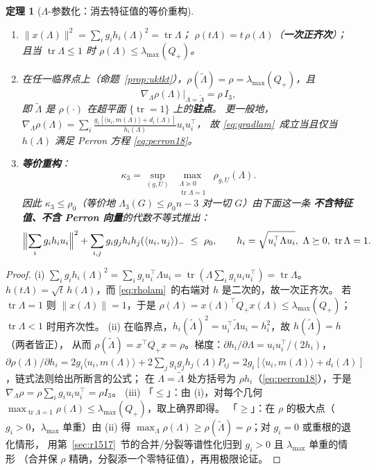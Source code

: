 \documentclass[UTF8,11pt]{ctexart}
\newtheorem{theorem}{定理}[section]
\theoremstyle{definition}
\newcommand{\Lam}{\Lambda}
\newcommand{\tr}{\operatorname{tr}}
\begin{document}
\begin{theorem}[$\Lam$-参数化：消去特征值的等价重构]\label{thm:lamparam}
\begin{enumerate}\itemsep3pt
\item[(i)] $\|x(\Lam)\|^2=\sum_ig_ih_i(\Lam)^2=\tr\Lam$；
$\rho(t\Lam)=t\,\rho(\Lam)$（\textbf{一次正齐次}）；
且当 $\tr\Lam\le1$ 时 $\rho(\Lam)\le\lambda_{\max}(Q_+)$。
\item[(ii)] 在任一临界点上（命题~\ref{prop:uktkt}），$\rho(\tilde\Lam)=\rho=\lambda_{\max}(Q_+)$，且
\begin{equation}\label{eq:gradlam}
\nabla_\Lam\rho(\Lam)\big|_{\Lam=\tilde\Lam}=\rho\,I_3 ,
\end{equation}
即 $\tilde\Lam$ 是 $\rho(\cdot)$ 在超平面 $\{\tr=1\}$ 上的\textbf{驻点}。
更一般地，$\nabla_\Lam\rho(\Lam)=\sum_i\frac{g_i[\langle u_i,m(\Lam)\rangle+d_i(\Lam)]}{h_i(\Lam)}u_iu_i^\top$，
故 \eqref{eq:gradlam}~成立当且仅当 $h(\Lam)$ 满足 Perron 方程 \eqref{eq:perron18}。
\item[(iii)] \textbf{等价重构}：
\begin{equation}\label{eq:kappalam}
\kappa_3=\sup_{(g,U)}\ \max_{\substack{\Lam\succeq0\\ \tr\Lam=1}}\ \rho_{g,U}(\Lam) .
\end{equation}
因此 $\kappa_3\le\rho_0$（等价地 $\Lam_3(G)\le\rho_0n-3$ 对一切 $G$）由下面这一条
\textbf{不含特征值、不含 Perron 向量}的代数不等式推出：
\begin{equation}\label{eq:starmain}
\Bigl\|\sum_ig_ih_iu_i\Bigr\|^2+\sum_{i,j}g_ig_jh_ih_j(\langle u_i,u_j\rangle)_-\ \le\ \rho_0 ,
\qquad h_i=\sqrt{u_i^\top\Lam u_i},\ \Lam\succeq0,\ \tr\Lam=1 .
\end{equation}
\end{enumerate}
\end{theorem}

\begin{proof}
(i) $\sum_ig_ih_i(\Lam)^2=\sum_ig_iu_i^\top\Lam u_i=\tr(\Lam\sum_ig_iu_iu_i^\top)=\tr\Lam$。
$h(t\Lam)=\sqrt t\,h(\Lam)$，而 \eqref{eq:rholam}~的右端对 $h$ 是二次的，故一次正齐次。
若 $\tr\Lam=1$ 则 $\|x(\Lam)\|=1$，于是 $\rho(\Lam)=x(\Lam)^\top Q_+x(\Lam)\le\lambda_{\max}(Q_+)$；
$\tr\Lam<1$ 时用齐次性。
(ii) 在临界点，$h_i(\tilde\Lam)^2=u_i^\top\tilde\Lam u_i=h_i^2$，故 $h(\tilde\Lam)=h$（两者皆正），
从而 $\rho(\tilde\Lam)=x^\top Q_+x=\rho$。梯度：$\partial h_i/\partial\Lam=u_iu_i^\top/(2h_i)$，
$\partial\rho(\Lam)/\partial h_i=2g_i\langle u_i,m(\Lam)\rangle+2\sum_jg_ig_jh_j(\Lam)P_{ij}
=2g_i[\langle u_i,m(\Lam)\rangle+d_i(\Lam)]$，链式法则给出所断言的公式；
在 $\Lam=\tilde\Lam$ 处方括号为 $\rho h_i$（\eqref{eq:perron18}），于是
$\nabla_\Lam\rho=\rho\sum_ig_iu_iu_i^\top=\rho I_3$。
(iii) 「$\le$」：由 (i)，对每个几何 $\max_{\tr\Lam=1}\rho(\Lam)\le\lambda_{\max}(Q_+)$，取上确界即得。
「$\ge$」：在 $\rho$ 的极大点（$g_i>0$，$\lambda_{\max}$ 单重）由 (ii) 得
$\max_\Lam\rho(\Lam)\ge\rho(\tilde\Lam)=\rho$；对 $g_i=0$ 或重根的退化情形，
用第~\ref{sec:r1517}~节的合并/分裂等谱性化归到 $g_i>0$ 且 $\lambda_{\max}$ 单重的情形
（合并保 $\rho$ 精确，分裂添一个零特征值），再用极限论证。
\end{proof}
\end{document}
